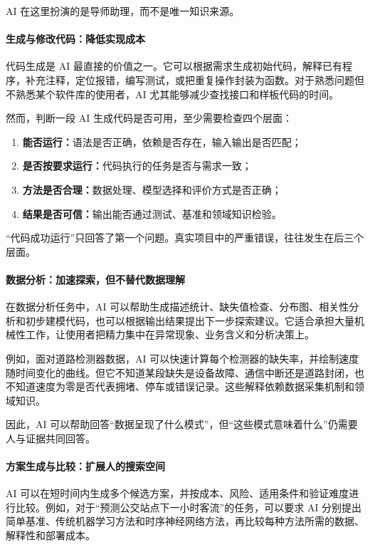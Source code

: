 AI 在这里扮演的是导师助理，而不是唯一知识来源。

\paragraph{生成与修改代码：降低实现成本}

代码生成是 AI 最直接的价值之一。它可以根据需求生成初始代码，解释已有程序，补充注释，定位报错，编写测试，或把重复操作封装为函数。对于熟悉问题但不熟悉某个软件库的使用者，AI 尤其能够减少查找接口和样板代码的时间。

然而，判断一段 AI 生成代码是否可用，至少需要检查四个层面：

\begin{enumerate}
  \item \textbf{能否运行：}语法是否正确，依赖是否存在，输入输出是否匹配；
  \item \textbf{是否按要求运行：}代码执行的任务是否与需求一致；
  \item \textbf{方法是否合理：}数据处理、模型选择和评价方式是否正确；
  \item \textbf{结果是否可信：}输出能否通过测试、基准和领域知识检验。
\end{enumerate}

“代码成功运行”只回答了第一个问题。真实项目中的严重错误，往往发生在后三个层面。

\paragraph{数据分析：加速探索，但不替代数据理解}

在数据分析任务中，AI 可以帮助生成描述统计、缺失值检查、分布图、相关性分析和初步建模代码，也可以根据输出结果提出下一步探索建议。它适合承担大量机械性工作，让使用者把精力集中在异常现象、业务含义和分析决策上。

例如，面对道路检测器数据，AI 可以快速计算每个检测器的缺失率，并绘制速度随时间变化的曲线。但它不知道某段缺失是设备故障、通信中断还是道路封闭，也不知道速度为零是否代表拥堵、停车或错误记录。这些解释依赖数据采集机制和领域知识。

因此，AI 可以帮助回答“数据呈现了什么模式”，但“这些模式意味着什么”仍需要人与证据共同回答。

\paragraph{方案生成与比较：扩展人的搜索空间}

AI 可以在短时间内生成多个候选方案，并按成本、风险、适用条件和验证难度进行比较。例如，对于“预测公交站点下一小时客流”的任务，可以要求 AI 分别提出简单基准、传统机器学习方法和时序神经网络方法，再比较每种方法所需的数据、解释性和部署成本。

